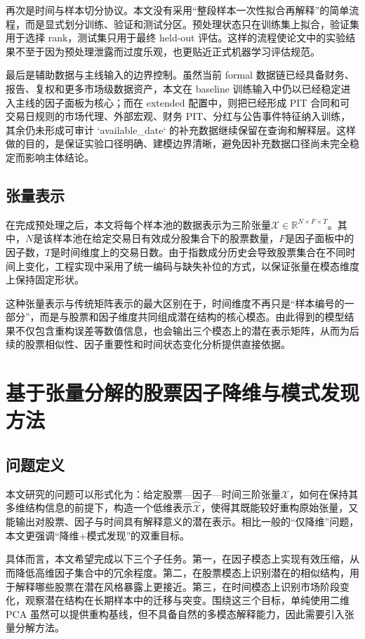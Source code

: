 再次是时间与样本切分协议。本文没有采用“整段样本一次性拟合再解释”的简单流程，而是显式划分训练、验证和测试分区。预处理状态只在训练集上拟合，验证集用于选择 rank，测试集只用于最终 held-out 评估。这样的流程使论文中的实验结果不至于因为预处理泄露而过度乐观，也更贴近正式机器学习评估规范。

最后是辅助数据与主线输入的边界控制。虽然当前 formal 数据链已经具备财务、报告、复权和更多市场级数据资产，本文在 baseline 训练输入中仍以已经稳定进入主线的因子面板为核心；而在 extended 配置中，则把已经形成 PIT 合同和可交易日规则的市场代理、外部宏观、财务 PIT、分红与公告事件特征纳入训练，其余仍未形成可审计 `available_date` 的补充数据继续保留在查询和解释层。这样做的目的，是保证实验口径明确、建模边界清晰，避免因补充数据口径尚未完全稳定而影响主体结论。

\section{张量表示}

在完成预处理之后，本文将每个样本池的数据表示为三阶张量$\mathcal{X}\in\mathbb{R}^{N\times F\times T}$。其中，$N$是该样本池在给定交易日有效成分股集合下的股票数量，$F$是因子面板中的因子数，$T$是时间维度上的交易日数。由于指数成分历史会导致股票集合在不同时间上变化，工程实现中采用了统一编码与缺失补位的方式，以保证张量在模态维度上保持固定形状。

这种张量表示与传统矩阵表示的最大区别在于，时间维度不再只是“样本编号的一部分”，而是与股票和因子维度共同组成潜在结构的核心模态。由此得到的模型结果不仅包含重构误差等数值信息，也会输出三个模态上的潜在表示矩阵，从而为后续的股票相似性、因子重要性和时间状态变化分析提供直接依据。

\chapter{基于张量分解的股票因子降维与模式发现方法}

\section{问题定义}

本文研究的问题可以形式化为：给定股票—因子—时间三阶张量$\mathcal{X}$，如何在保持其多维结构信息的前提下，构造一个低维表示$\hat{\mathcal{X}}$，使得其既能较好重构原始张量，又能输出对股票、因子与时间具有解释意义的潜在表示。相比一般的“仅降维”问题，本文更强调“降维+模式发现”的双重目标。

具体而言，本文希望完成以下三个子任务。第一，在因子模态上实现有效压缩，从而降低高维因子集合中的冗余程度。第二，在股票模态上识别潜在的相似结构，用于解释哪些股票在潜在风格暴露上更接近。第三，在时间模态上识别市场阶段变化，观察潜在结构在长期样本中的迁移与突变。围绕这三个目标，单纯使用二维 PCA 虽然可以提供重构基线，但不具备自然的多模态解释能力，因此需要引入张量分解方法。

